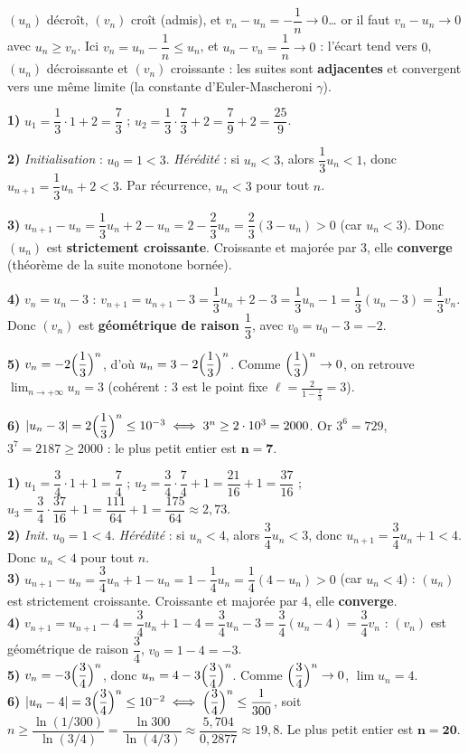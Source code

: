 $(u_n)$ décroît, $(v_n)$ croît (admis), et $v_n-u_n=-\dfrac1n\to0$… or il faut
$v_n-u_n\to0$ avec $u_n\ge v_n$. Ici $v_n=u_n-\dfrac1n\le u_n$, et $u_n-v_n=\dfrac1n\to0$ :
l'écart tend vers $0$, $(u_n)$ décroissante et $(v_n)$ croissante : les suites sont
\textbf{adjacentes} et convergent vers une même limite (la constante d'Euler-Mascheroni $\gamma$).

\textbf{1)} $u_1=\dfrac13\cdot1+2=\dfrac73$ ; $u_2=\dfrac13\cdot\dfrac73+2=\dfrac{7}{9}+2=\dfrac{25}{9}$.

\noindent\textbf{2)} \emph{Initialisation} : $u_0=1<3$. \emph{Hérédité} : si $u_n<3$, alors
$\dfrac13 u_n<1$, donc $u_{n+1}=\dfrac13 u_n+2<3$. Par récurrence, $u_n<3$ pour tout $n$.

\noindent\textbf{3)} $u_{n+1}-u_n=\dfrac13 u_n+2-u_n=2-\dfrac23 u_n=\dfrac23(3-u_n)>0$
(car $u_n<3$). Donc $(u_n)$ est \textbf{strictement croissante}. Croissante et majorée par $3$,
elle \textbf{converge} (théorème de la suite monotone bornée).

\noindent\textbf{4)} $v_n=u_n-3$ :
$v_{n+1}=u_{n+1}-3=\dfrac13 u_n+2-3=\dfrac13 u_n-1=\dfrac13(u_n-3)=\dfrac13 v_n$.
Donc $(v_n)$ est \textbf{géométrique de raison $\dfrac13$}, avec $v_0=u_0-3=-2$.

\noindent\textbf{5)} $v_n=-2\Bigl(\dfrac13\Bigr)^n$, d'où $u_n=3-2\Bigl(\dfrac13\Bigr)^n$.
Comme $\Bigl(\dfrac13\Bigr)^n\to0$, on retrouve $\displaystyle\lim_{n\to+\infty}u_n=3$
(cohérent : $3$ est le point fixe $\ell=\tfrac{2}{1-\frac13}=3$).

\noindent\textbf{6)} $|u_n-3|=2\Bigl(\dfrac13\Bigr)^n\le10^{-3}\iff 3^n\ge2\cdot10^3=2000$.
Or $3^6=729$, $3^7=2187\ge2000$ : le plus petit entier est $\mathbf{n=7}$.

\textbf{1)} $u_1=\dfrac34\cdot1+1=\dfrac74$ ; $u_2=\dfrac34\cdot\dfrac74+1=\dfrac{21}{16}+1=\dfrac{37}{16}$ ;
$u_3=\dfrac34\cdot\dfrac{37}{16}+1=\dfrac{111}{64}+1=\dfrac{175}{64}\approx2{,}73$.\\
\textbf{2)} \emph{Init.} $u_0=1<4$. \emph{Hérédité} : si $u_n<4$, alors $\dfrac34 u_n<3$, donc
$u_{n+1}=\dfrac34 u_n+1<4$. Donc $u_n<4$ pour tout $n$.\\
\textbf{3)} $u_{n+1}-u_n=\dfrac34 u_n+1-u_n=1-\dfrac14 u_n=\dfrac14(4-u_n)>0$ (car $u_n<4$) :
$(u_n)$ est strictement croissante. Croissante et majorée par $4$, elle \textbf{converge}.\\
\textbf{4)} $v_{n+1}=u_{n+1}-4=\dfrac34 u_n+1-4=\dfrac34 u_n-3=\dfrac34(u_n-4)=\dfrac34 v_n$ :
$(v_n)$ est géométrique de raison $\dfrac34$, $v_0=1-4=-3$.\\
\textbf{5)} $v_n=-3\Bigl(\dfrac34\Bigr)^n$, donc $u_n=4-3\Bigl(\dfrac34\Bigr)^n$. Comme
$\Bigl(\dfrac34\Bigr)^n\to0$, $\displaystyle\lim u_n=4$.\\
\textbf{6)} $|u_n-4|=3\Bigl(\dfrac34\Bigr)^n\le10^{-2}\iff\Bigl(\dfrac34\Bigr)^n\le\dfrac1{300}$,
soit $n\ge\dfrac{\ln(1/300)}{\ln(3/4)}=\dfrac{\ln300}{\ln(4/3)}\approx\dfrac{5{,}704}{0{,}2877}\approx19{,}8$.
Le plus petit entier est $\mathbf{n=20}$.


